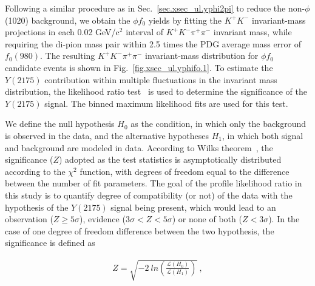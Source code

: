 Following a similar procedure as in Sec.~\ref{sec.xsec_ul.yphi2pi} to reduce the non-$\phi$(1020) background, we obtain the $\phi f_{0}$ yields by fitting the $K^{+}K^{-}$ invariant-mass projections in each 0.02 GeV/c$^{2}$ interval of $K^{+}K^{-}\pi^{+}\pi^{-}$ invariant mass, while requiring the di-pion mass pair within 2.5 times the PDG average mass error of $f_0(980)$. The resulting $K^{+}K^{-}\pi^{+}\pi^{-}$ invariant-mass distribution for $\phi f_{0}$ candidate events is shown in Fig.~\ref{fig.xsec_ul.yphifo.1}. To estimate the $Y(2175)$ contribution within multiple fluctuations in the invariant mass distribution, the likelihood ratio test~\cite{Cow11} is used to determine the significance of the $Y(2175)$ signal. The binned maximum likelihood fits are used for this test.
~\par We define the null hypothesis $H_{0}$ as the condition, in which only the background is observed in the data, and the alternative hypotheses $H_{1}$, in which both signal and background are modeled in data. According to Wilks theorem~\cite{Wil01}, the significance ($Z$) adopted as the test statistics is asymptotically distributed according to the $\chi^{2}$ function, with degrees of freedom equal to the difference between the number of fit parameters. The goal of the profile likelihood ratio in this study is to quantify degree of compatibility (or not) of the data with the hypothesis of the $Y(2175)$ signal being present, which would lead to an observation ($Z \geq 5\sigma$), evidence ($3\sigma < Z < 5\sigma$) or none of both ($Z < 3\sigma$). In the case of one degree of freedom difference between the two hypothesis, the significance is defined as

\begin{equation}
    \label{eq.xsec_ul.yphifo}
    \begin{aligned}
        Z = \sqrt{-2~ln\left(\frac{\mathcal{L}(H_{0})}{\mathcal{L}(H_{1})}\right)}~,
    \end{aligned}
\end{equation}

